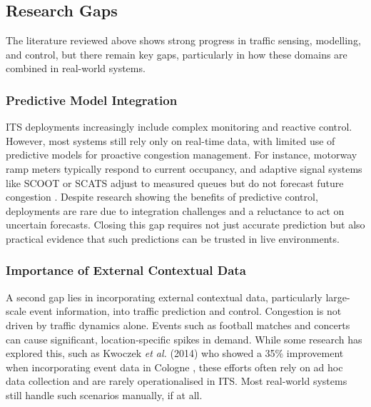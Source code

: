 \subsection{Research Gaps}

The literature reviewed above shows strong progress in traffic sensing, modelling, and control, but there remain key gaps, particularly in how these domains are combined in real-world systems.

\subsubsection{Predictive Model Integration}

ITS deployments increasingly include complex monitoring and reactive control. However, most systems still rely only on real-time data, with limited use of predictive models for proactive congestion management. For instance, motorway ramp meters typically respond to current occupancy, and adaptive signal systems like SCOOT or SCATS adjust to measured queues but do not forecast future congestion \cite{stevanovic_scoot_2009}. Despite research showing the benefits of predictive control, deployments are rare due to integration challenges and a reluctance to act on uncertain forecasts. Closing this gap requires not just accurate prediction but also practical evidence that such predictions can be trusted in live environments.

\subsubsection{Importance of External Contextual Data}

A second gap lies in incorporating external contextual data, particularly large-scale event information, into traffic prediction and control. Congestion is not driven by traffic dynamics alone. Events such as football matches and concerts can cause significant, location-specific spikes in demand. While some research has explored this, such as Kwoczek \textit{et al.} (2014) who showed a 35\% improvement when incorporating event data in Cologne \cite{kwoczek_predicting_2014}, these efforts often rely on ad hoc data collection and are rarely operationalised in ITS. Most real-world systems still handle such scenarios manually, if at all.

